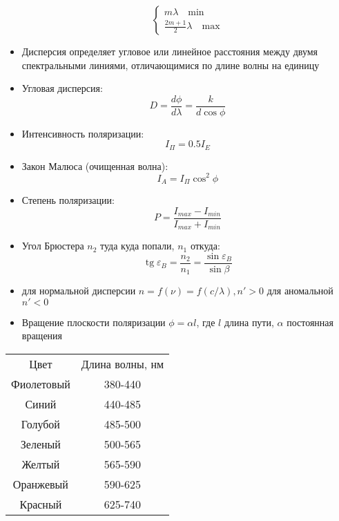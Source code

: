 \documentclass[twoside, a4paperpt, fleqn]{extarticle}
\begin{document}
\begin{multicols}{2}
\begin{itemize}
\begin{equation*}
\begin{cases}
                    m \lambda  \quad \text{min} \\
                    \frac{2 m + 1}{2} \lambda \quad \text{max}
                \end{cases}
            \end{equation*}
            \item Дисперсия определяет угловое или линейное расстояния между 
            двумя спектральными линиями, отличающимися по длине волны 
            на единицу
            \item Угловая дисперсия:
            \begin{equation*}
                D = \frac{d \phi}{d \lambda} = \frac{k}{d \cos \phi}
            \end{equation*}
            \item Интенсивность поляризации:
            \begin{equation*}
                I_{\Pi} = 0.5 I_E
            \end{equation*}
            \item Закон Малюса (очищенная волна):
            \begin{equation*}
                I_A = I_{\Pi} \cos^2 \phi
            \end{equation*}
            \item Степень поляризации:
            \begin{equation*}
                P = \frac{I_{max} - I_{min}}{I_{max} + I_{min}}
            \end{equation*}
            \item Угол Брюстера $n_2$ туда куда попали, $n_1$ откуда:
            \begin{equation*}
                \operatorname{tg} \varepsilon_B = \frac{n_2}{n_1} = \frac{\sin \varepsilon_B}{\sin \beta} 
            \end{equation*}
            \item для нормальной дисперсии $n = f(\nu) = f(c / \lambda), n' > 0$ для аномальной $n ' < 0$
            \item Вращение плоскости поляризации $\phi = \alpha l$, где $l$ длина пути, $\alpha$ постоянная вращения
        \end{itemize}
    \end{multicols}
\begin{table}[h!]
    \begin{tabular}{cc}
    Цвет       & Длина волны, нм \\
    Фиолетовый & 380-440         \\
    Синий      & 440-485         \\
    Голубой    & 485-500         \\
    Зеленый    & 500-565         \\
    Желтый     & 565-590         \\
    Оранжевый  & 590-625         \\
    Красный    & 625-740        
    \end{tabular}
    \end{table}
\end{document}
